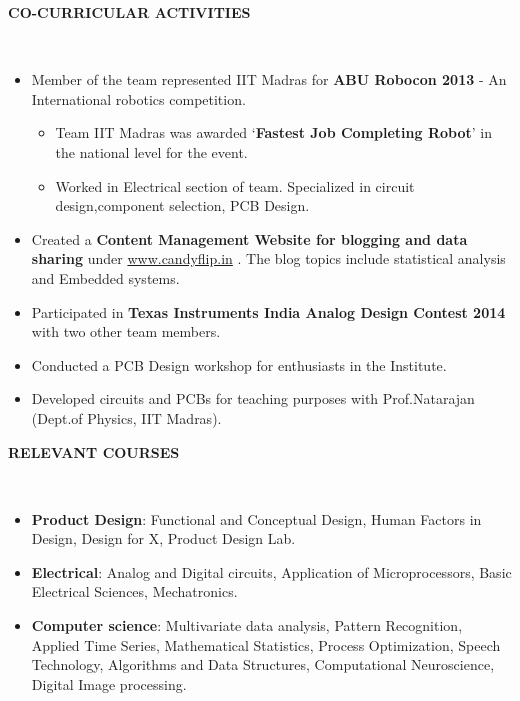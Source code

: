 \documentclass[a4paper,10pt]{article}
\newcommand{\lsep}{-0.5cm}
\newcommand{\resheading}[1]{{\small \colorbox{mygrey}{\begin{minipage}{0.975\textwidth}{\textbf{#1 \vphantom{p\^{E}}}}\end{minipage}}}}
\begin{document}
\resheading{\textbf{CO-CURRICULAR ACTIVITIES} }\\[\lsep]
    \begin{itemize}
        \item Member of the team represented IIT Madras for \textbf{ABU Robocon 2013} - An International robotics competition.
        \begin{itemize}
            \vspace{-5pt}
            \item Team IIT Madras was awarded `\textbf{Fastest Job Completing Robot}' in the national level for the event.
            \item  Worked in Electrical section of team. Specialized in circuit design,component selection, PCB Design.
        \end{itemize}
        \item Created a \textbf{Content Management Website for blogging and data sharing} under \hspace{3pt}\url{www.candyflip.in} . The blog topics include statistical analysis and Embedded systems.
        \vspace{-5pt}
        \item Participated in \textbf{Texas Instruments India Analog Design Contest 2014} with two other team members.
        \vspace{-5pt}       
        \item Conducted a PCB Design workshop for enthusiasts in the Institute.
        \vspace{-5pt}
        \item Developed circuits and PCBs for teaching purposes with Prof.Natarajan (Dept.of Physics, IIT Madras).
    \end{itemize}
        
\resheading{\textbf{RELEVANT COURSES} }\\[\lsep]
\begin{itemize}
    \item \textbf{Product Design}: Functional and Conceptual Design, Human Factors in Design, Design for X, Product Design Lab.
    \vspace{-5pt}
    \item  \textbf{Electrical}: Analog and Digital circuits, Application of Microprocessors, Basic Electrical Sciences, Mechatronics.
    \vspace{-5pt}
    \item \textbf{Computer science}: Multivariate data analysis, Pattern Recognition, Applied Time Series, Mathematical Statistics, Process Optimization, Speech Technology, Algorithms and Data Structures, Computational Neuroscience, Digital Image processing.
\end{itemize}
\end{document}
